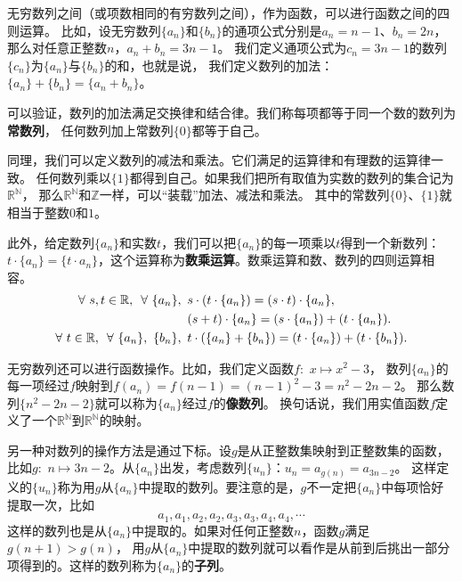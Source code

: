 \documentclass[12pt,UTF8]{ctexbook}
\begin{document}
无穷数列之间（或项数相同的有穷数列之间），作为函数，可以进行函数之间的四则运算。
比如，设无穷数列$\{a_n\}$和$\{b_n\}$的通项公式分别是$a_n = n - 1$、$b_n = 2n$，
那么对任意正整数$n$，$a_n + b_n = 3n - 1$。
我们定义通项公式为$c_n = 3n - 1$的数列$\{c_n\}$为$\{a_n\}$与$\{b_n\}$的和，也就是说，
我们定义数列的加法：$\{a_n\} + \{b_n\} = \{a_n + b_n\}$。

可以验证，数列的加法满足交换律和结合律。我们称每项都等于同一个数的数列为\textbf{常数列}，
任何数列加上常数列$\{0\}$都等于自己。

同理，我们可以定义数列的减法和乘法。它们满足的运算律和有理数的运算律一致。
任何数列乘以$\{1\}$都得到自己。如果我们把所有取值为实数的数列的集合记为$\mathbb{R}^\mathbb{N}$，
那么$\mathbb{R}^\mathbb{N}$和$\mathbb{Z}$一样，可以“装载”加法、减法和乘法。
其中的常数列$\{0\}$、$\{1\}$就相当于整数$0$和$1$。

此外，给定数列$\{a_n\}$和实数$t$，我们可以把$\{a_n\}$的每一项乘以$t$得到一个新数列：
$t\cdot \{a_n\} = \{t\cdot a_n\}$，这个运算称为\textbf{数乘运算}。数乘运算和数、数列的四则运算相容。
\begin{align}
    \forall  \,\, s, t \in \mathbb{R}, \,\,\, \forall \,\, \{a_n\}, \,\,\,& s \cdot (t\cdot \{a_n\}) = (s\cdot t)\cdot \{a_n\}, \notag \\
    & (s + t) \cdot \{a_n\} = (s\cdot \{a_n\}) + (t\cdot \{a_n\}). \notag \\
    \forall  \,\, t \in \mathbb{R}, \,\,\, \forall \,\, \{a_n\}, \,\, \{b_n\},\,\,\, & t \cdot (\{a_n\} + \{b_n\}) = (t \cdot \{a_n\}) + (t \cdot \{b_n\}). \notag 
\end{align}

无穷数列还可以进行函数操作。比如，我们定义函数$f:\,\,x\mapsto x^2 - 3$，
数列$\{a_n\}$的每一项经过$f$映射到$f(a_n) = f(n-1) = (n-1)^2 - 3 = n^2 - 2n - 2$。
那么数列$\{n^2-2n-2\}$就可以称为$\{a_n\}$经过$f$的\textbf{像数列}。
换句话说，我们用实值函数$f$定义了一个$\mathbb{R}^\mathbb{N}$到$\mathbb{R}^\mathbb{N}$的映射。

另一种对数列的操作方法是通过下标。设$g$是从正整数集映射到正整数集的函数，
比如$g:\,\, n \mapsto 3n - 2$。从$\{a_n\}$出发，考虑数列$\{u_n\}$：$u_n = a_{g(n)} = a_{3n-2}$。
这样定义的$\{u_n\}$称为用$g$从$\{a_n\}$中提取的数列。要注意的是，$g$不一定把$\{a_n\}$中每项恰好提取一次，比如
$$ a_1, a_1, a_2, a_2, a_3, a_3, a_4, a_4, \cdots $$
这样的数列也是从$\{a_n\}$中提取的。如果对任何正整数$n$，函数$g$满足$g(n+1) > g(n)$，
用$g$从$\{a_n\}$中提取的数列就可以看作是从前到后挑出一部分项得到的。这样的数列称为$\{a_n\}$的\textbf{子列}。
\end{document}
